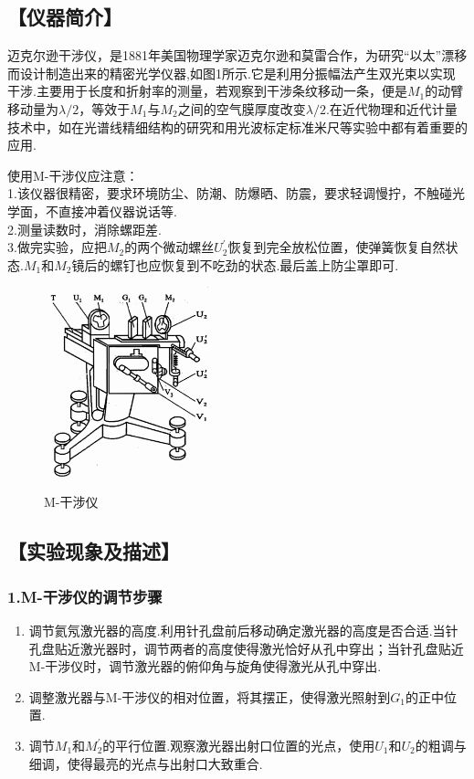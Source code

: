 \documentclass[12pt,a4paper,UTF8]{ctexart}
\begin{document}
\subsection*{【仪器简介】}
	迈克尔逊干涉仪，是1881年美国物理学家迈克尔逊和莫雷合作，为研究“以太”漂移而设计制造出来的精密光学仪器,如图1所示.它是利用分振幅法产生双光束以实现干涉.主要用于长度和折射率的测量，若观察到干涉条纹移动一条，便是$M_1$的动臂移动量为$\lambda/2$，等效于$M_1$与$M_2$之间的空气膜厚度改变$\lambda/2$.在近代物理和近代计量技术中，如在光谱线精细结构的研究和用光波标定标准米尺等实验中都有着重要的应用.\par
	使用M-干涉仪应注意：\\
	1.该仪器很精密，要求环境防尘、防潮、防爆晒、防震，要求轻调慢拧，不触碰光学面，不直接冲着仪器说话等.\\
	2.测量读数时，消除螺距差.\\
	3.做完实验，应把$M_2$的两个微动螺丝$U_2^{\prime}$恢复到完全放松位置，使弹簧恢复自然状态.$M_1$和$M_2$镜后的螺钉也应恢复到不吃劲的状态.最后盖上防尘罩即可.
	\begin{figure}[htbp]
	\centering
		\includegraphics[width=5cm]{M.png}
		\caption{M-干涉仪}
	\end{figure}
\subsection*{【实验现象及描述】}

\subsubsection*{1.M-干涉仪的调节步骤}
	\begin{enumerate}[(1)]
	\item 调节氦氖激光器的高度.利用针孔盘前后移动确定激光器的高度是否合适.当针孔盘贴近激光器时，调节两者的高度使得激光恰好从孔中穿出；当针孔盘贴近M-干涉仪时，调节激光器的俯仰角与旋角使得激光从孔中穿出.
	\item 调整激光器与M-干涉仪的相对位置，将其摆正，使得激光照射到$G_1$的正中位置.
	\item 调节$M_1$和$M_2^{\prime}$的平行位置.观察激光器出射口位置的光点，使用$U_1$和$U_2$的粗调与细调，使得最亮的光点与出射口大致重合.
	\end{enumerate}
\end{document}
